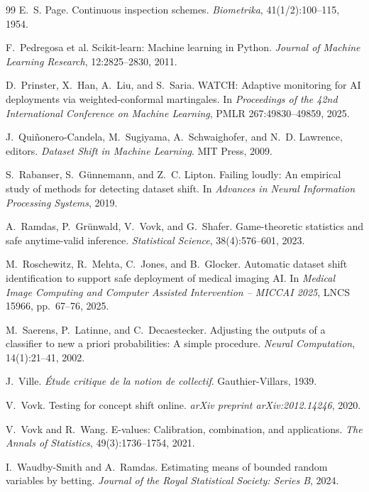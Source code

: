 \documentclass[11pt,a4paper]{article}
\theoremstyle{definition}
\newcommand{\1}{\mathbf{1}}
\begin{document}
\begin{thebibliography}{99}
E.~S. Page.
Continuous inspection schemes.
\textit{Biometrika}, 41(1/2):100--115, 1954.

F.~Pedregosa et al.
Scikit-learn: Machine learning in Python.
\textit{Journal of Machine Learning Research}, 12:2825--2830, 2011.

D.~Prinster, X.~Han, A.~Liu, and S.~Saria.
WATCH: Adaptive monitoring for AI deployments via weighted-conformal martingales.
In \textit{Proceedings of the 42nd International Conference on Machine Learning}, PMLR 267:49830--49859, 2025.

J.~Qui\~nonero-Candela, M.~Sugiyama, A.~Schwaighofer, and N.~D. Lawrence, editors.
\textit{Dataset Shift in Machine Learning}.
MIT Press, 2009.

S.~Rabanser, S.~G\"unnemann, and Z.~C. Lipton.
Failing loudly: An empirical study of methods for detecting dataset shift.
In \textit{Advances in Neural Information Processing Systems}, 2019.

A.~Ramdas, P.~Gr\"unwald, V.~Vovk, and G.~Shafer.
Game-theoretic statistics and safe anytime-valid inference.
\textit{Statistical Science}, 38(4):576--601, 2023.

M.~Roschewitz, R.~Mehta, C.~Jones, and B.~Glocker.
Automatic dataset shift identification to support safe deployment of medical imaging AI.
In \textit{Medical Image Computing and Computer Assisted Intervention -- MICCAI 2025}, LNCS 15966, pp.~67--76, 2025.

M.~Saerens, P.~Latinne, and C.~Decaestecker.
Adjusting the outputs of a classifier to new a priori probabilities: A simple procedure.
\textit{Neural Computation}, 14(1):21--41, 2002.

J.~Ville.
\textit{\'Etude critique de la notion de collectif}.
Gauthier-Villars, 1939.

V.~Vovk.
Testing for concept shift online.
\textit{arXiv preprint arXiv:2012.14246}, 2020.

V.~Vovk and R.~Wang.
E-values: Calibration, combination, and applications.
\textit{The Annals of Statistics}, 49(3):1736--1754, 2021.

I.~Waudby-Smith and A.~Ramdas.
Estimating means of bounded random variables by betting.
\textit{Journal of the Royal Statistical Society: Series B}, 2024.
\end{thebibliography}
\end{document}
